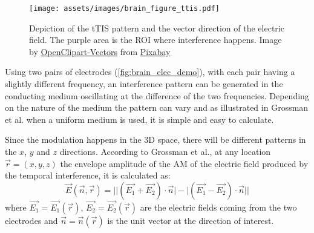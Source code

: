 \begin{wrapfigure}{r}{0.48\textwidth}
    \vspace{-10pt}
    \centering
    \texttt{[image: assets/images/brain\_figure\_ttis.pdf]}
    \caption[Depiction of the \gls{tTIS} pattern and the vector direction of the electric field. The purple area is the \gls{ROI} where interference happens.]{Depiction of the \gls{tTIS} pattern and the vector direction of the electric field. The purple area is the \gls{ROI} where interference happens. Image by \href{https://pixabay.com/users/openclipart-vectors-30363/?utm_source=link-attribution&amp;utm_medium=referral&amp;utm_campaign=image&amp;utm_content=150935}{OpenClipart-Vectors} from \href{https://pixabay.com/?utm_source=link-attribution&amp;utm_medium=referral&amp;utm_campaign=image&amp;utm_content=150935}{Pixabay}}
    \label{fig:brain_elec_demo}
\end{wrapfigure}

Using two pairs of electrodes (\autoref{fig:brain_elec_demo}), with each pair having a slightly different frequency, an interference pattern can be generated in the conducting medium oscillating at the difference of the two frequencies. Depending on the nature of the medium the pattern can vary and as illustrated in Grossman et al.\cite{Grossman2017} when a uniform medium is used, it is simple and easy to calculate.

Since the modulation happens in the 3D space, there will be different patterns in the $x$, $y$ and $z$ directions. According to Grossman et al.\cite[page 20]{Grossman2017}, at any location $\vec{r} = (x,y,z)$ the envelope amplitude of the \gls{AM} of the electric field produced by the temporal interference, it is calculated as:
\begin{equation}
    \label{eq:directional_amplitude}
    \vec{E}(\vec{n},\vec{r}) = \Big|\big|(\vec{E_1} + \vec{E_2})\cdot\vec{n}\big| - \big|(\vec{E_1} - \vec{E_2})\cdot\vec{n}\big|\Big|
\end{equation}
where $\vec{E_1} = \vec{E_1}(\vec{r})$, $\vec{E_2} = \vec{E_2}(\vec{r})$ are the electric fields coming from the two electrodes and $\vec{n} = \vec{n}(\vec{r})$ is the unit vector at the direction of interest.
\\\vspace{1pt}


